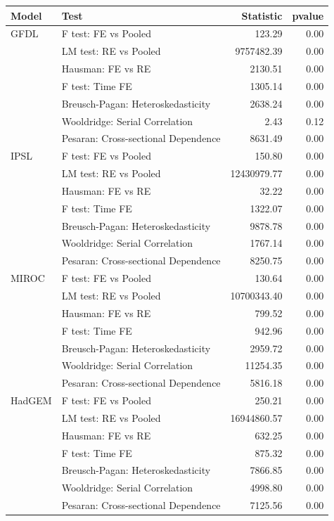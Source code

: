 \begin{tabular}{llrr}
  \toprule
Model & Test & Statistic & pvalue \\ 
  \midrule
GFDL & F test: FE vs Pooled & 123.29 & 0.00 \\ 
   & LM test: RE vs Pooled & 9757482.39 & 0.00 \\ 
   & Hausman: FE vs RE & 2130.51 & 0.00 \\ 
   & F test: Time FE & 1305.14 & 0.00 \\ 
   & Breusch-Pagan: Heteroskedasticity & 2638.24 & 0.00 \\ 
   & Wooldridge: Serial Correlation & 2.43 & 0.12 \\ 
   & Pesaran: Cross-sectional Dependence & 8631.49 & 0.00 \\ 
  IPSL & F test: FE vs Pooled & 150.80 & 0.00 \\ 
   & LM test: RE vs Pooled & 12430979.77 & 0.00 \\ 
   & Hausman: FE vs RE & 32.22 & 0.00 \\ 
   & F test: Time FE & 1322.07 & 0.00 \\ 
   & Breusch-Pagan: Heteroskedasticity & 9878.78 & 0.00 \\ 
   & Wooldridge: Serial Correlation & 1767.14 & 0.00 \\ 
   & Pesaran: Cross-sectional Dependence & 8250.75 & 0.00 \\ 
  MIROC & F test: FE vs Pooled & 130.64 & 0.00 \\ 
   & LM test: RE vs Pooled & 10700343.40 & 0.00 \\ 
   & Hausman: FE vs RE & 799.52 & 0.00 \\ 
   & F test: Time FE & 942.96 & 0.00 \\ 
   & Breusch-Pagan: Heteroskedasticity & 2959.72 & 0.00 \\ 
   & Wooldridge: Serial Correlation & 11254.35 & 0.00 \\ 
   & Pesaran: Cross-sectional Dependence & 5816.18 & 0.00 \\ 
  HadGEM & F test: FE vs Pooled & 250.21 & 0.00 \\ 
   & LM test: RE vs Pooled & 16944860.57 & 0.00 \\ 
   & Hausman: FE vs RE & 632.25 & 0.00 \\ 
   & F test: Time FE & 875.32 & 0.00 \\ 
   & Breusch-Pagan: Heteroskedasticity & 7866.85 & 0.00 \\ 
   & Wooldridge: Serial Correlation & 4998.80 & 0.00 \\ 
   & Pesaran: Cross-sectional Dependence & 7125.56 & 0.00 \\ 
   \bottomrule
\end{tabular}
